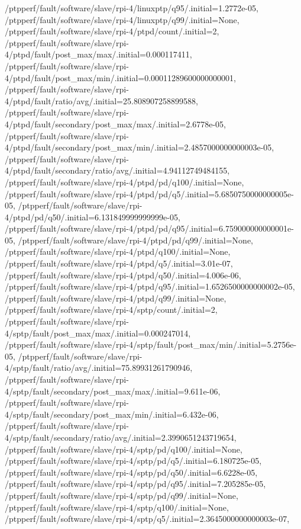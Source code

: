 {    /ptpperf/fault/software/slave/rpi-4/linuxptp/q95/.initial=1.2772e-05,
    /ptpperf/fault/software/slave/rpi-4/linuxptp/q99/.initial=None,
    /ptpperf/fault/software/slave/rpi-4/ptpd/count/.initial=2,
    /ptpperf/fault/software/slave/rpi-4/ptpd/fault/post_max/max/.initial=0.000117411,
    /ptpperf/fault/software/slave/rpi-4/ptpd/fault/post_max/min/.initial=0.00011289600000000001,
    /ptpperf/fault/software/slave/rpi-4/ptpd/fault/ratio/avg/.initial=25.808907258899588,
    /ptpperf/fault/software/slave/rpi-4/ptpd/fault/secondary/post_max/max/.initial=2.6778e-05,
    /ptpperf/fault/software/slave/rpi-4/ptpd/fault/secondary/post_max/min/.initial=2.4857000000000003e-05,
    /ptpperf/fault/software/slave/rpi-4/ptpd/fault/secondary/ratio/avg/.initial=4.94112749484155,
    /ptpperf/fault/software/slave/rpi-4/ptpd/pd/q100/.initial=None,
    /ptpperf/fault/software/slave/rpi-4/ptpd/pd/q5/.initial=5.6850750000000005e-05,
    /ptpperf/fault/software/slave/rpi-4/ptpd/pd/q50/.initial=6.131849999999999e-05,
    /ptpperf/fault/software/slave/rpi-4/ptpd/pd/q95/.initial=6.759000000000001e-05,
    /ptpperf/fault/software/slave/rpi-4/ptpd/pd/q99/.initial=None,
    /ptpperf/fault/software/slave/rpi-4/ptpd/q100/.initial=None,
    /ptpperf/fault/software/slave/rpi-4/ptpd/q5/.initial=3.01e-07,
    /ptpperf/fault/software/slave/rpi-4/ptpd/q50/.initial=4.006e-06,
    /ptpperf/fault/software/slave/rpi-4/ptpd/q95/.initial=1.6526500000000002e-05,
    /ptpperf/fault/software/slave/rpi-4/ptpd/q99/.initial=None,
    /ptpperf/fault/software/slave/rpi-4/sptp/count/.initial=2,
    /ptpperf/fault/software/slave/rpi-4/sptp/fault/post_max/max/.initial=0.000247014,
    /ptpperf/fault/software/slave/rpi-4/sptp/fault/post_max/min/.initial=5.2756e-05,
    /ptpperf/fault/software/slave/rpi-4/sptp/fault/ratio/avg/.initial=75.89931261790946,
    /ptpperf/fault/software/slave/rpi-4/sptp/fault/secondary/post_max/max/.initial=9.611e-06,
    /ptpperf/fault/software/slave/rpi-4/sptp/fault/secondary/post_max/min/.initial=6.432e-06,
    /ptpperf/fault/software/slave/rpi-4/sptp/fault/secondary/ratio/avg/.initial=2.3990651243719654,
    /ptpperf/fault/software/slave/rpi-4/sptp/pd/q100/.initial=None,
    /ptpperf/fault/software/slave/rpi-4/sptp/pd/q5/.initial=6.180725e-05,
    /ptpperf/fault/software/slave/rpi-4/sptp/pd/q50/.initial=6.6228e-05,
    /ptpperf/fault/software/slave/rpi-4/sptp/pd/q95/.initial=7.205285e-05,
    /ptpperf/fault/software/slave/rpi-4/sptp/pd/q99/.initial=None,
    /ptpperf/fault/software/slave/rpi-4/sptp/q100/.initial=None,
    /ptpperf/fault/software/slave/rpi-4/sptp/q5/.initial=2.3645000000000003e-07,
}
